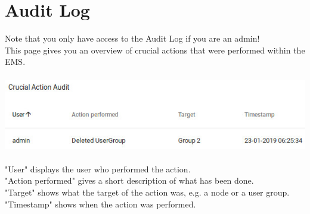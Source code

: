 \documentclass[twoside,a4paper]{refart}
\begin{document}
\section{Audit Log}
Note that you only have access to the Audit Log if you are an admin! \\
This page gives you an overview of crucial actions that were performed within the EMS. \\ \\
\includegraphics[width=\linewidth]{audit.jpeg} \\ \\
"User" displays the user who performed the action. \\
"Action performed" gives a short description of what has been done. \\
"Target" shows what the target of the action was, e.g. a node or a user group. \\
"Timestamp" shows when the action was performed.
\end{document}
